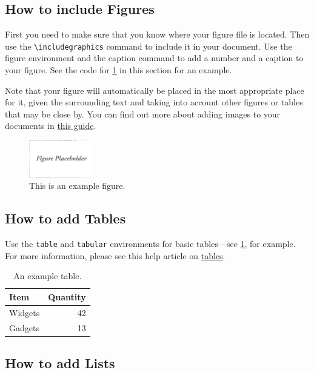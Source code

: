 \documentclass[11pt,twocolumn]{article}
\begin{document}
\subsection{How to include Figures}

First you need to make sure that you know where your figure file is located. Then use the \verb|\includegraphics| command to include it in your document. Use the figure environment and the caption command to add a number and a caption to your figure. See the code for \cref{fig:draft} in this section for an example.

Note that your figure will automatically be placed in the most appropriate place for it, given the surrounding text and taking into account other figures or tables that may be close by. You can find out more about adding images to your documents in \href{https://www.overleaf.com/learn/how-to/Including_images_on_Overleaf}{this guide}.

\begin{figure}[h!]
	\centering
	\includegraphics[width=0.25\textwidth]{draft}
	\caption{This is an example figure.}
	\label{fig:draft}
\end{figure}

\subsection{How to add Tables}

Use the \verb|table| and \verb|tabular| environments for basic tables---see \cref{tab:widgets}, for example. For more information, please see this help article on \href{https://www.overleaf.com/learn/latex/tables}{tables}. 

\begin{table}[h!]
	\centering
	\caption{An example table.}
	\label{tab:widgets}
	\begin{tabular}{l|r}
		Item & Quantity \\\hline
		Widgets & 42 \\
		Gadgets & 13
	\end{tabular}
\end{table}


\subsection{How to add Lists}
\end{document}
